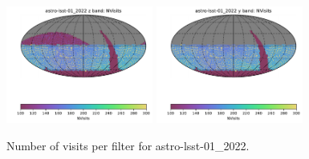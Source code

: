 \documentclass[DM,authoryear,toc]{lsstdoc}
\begin{document}
\begin{figure}[ht]
\includegraphics[width=0.43\textwidth]{figures/astro-lsst-01_2022_NVisits_z_band_HEAL_SkyMap}
\includegraphics[width=0.43\textwidth]{figures/astro-lsst-01_2022_NVisits_y_band_HEAL_SkyMap}
\caption{Number of visits per filter for astro-lsst-01\_2022.
\label{fig:baseline_nvisits}}
\end{figure}
\end{document}
